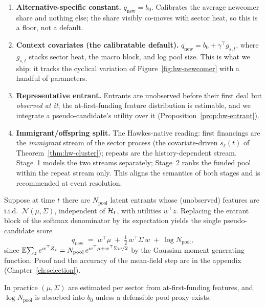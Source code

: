 \begin{enumerate}
\item \textbf{Alternative-specific constant.} $q_{\mathrm{new}} = b_0$. Calibrates the
average newcomer share and nothing else; the share visibly co-moves with sector heat, so
this is a floor, not a default.
\item \textbf{Context covariates (the calibratable default).}
$q_{\mathrm{new}} = b_0 + \gamma^\top g_{s,t}$, where $g_{s,t}$ stacks sector heat, the
macro block, and log pool size. This is what we ship: it tracks the cyclical variation of
Figure~\ref{fig:hw-newcomer} with a handful of parameters.
\item \textbf{Representative entrant.} Entrants are unobserved before their first deal
but \emph{observed at it}; the at-first-funding feature distribution is estimable, and we
integrate a pseudo-candidate's utility over it (Proposition~\ref{prop:hw-entrant}).
\item \textbf{Immigrant/offspring split.} The Hawkes-native reading: first financings are
the \emph{immigrant} stream of the sector process (the covariate-driven $s_\ell(t)$ of
Theorem~\ref{thm:hw-cluster}); repeats are the history-dependent stream. Stage~1 models
the two streams separately; Stage~2 ranks the funded pool within the repeat stream only.
This aligns the semantics of both stages and is recommended at event resolution.
\end{enumerate}

\begin{proposition}
\label{prop:hw-entrant}
Suppose at time $t$ there are $N_{\mathrm{pool}}$ latent entrants whose (unobserved)
features are i.i.d.\ $\mathcal{N}(\mu, \Sigma)$, independent of $\mathcal{H}_t$, with utilities
$w^\top z$. Replacing the entrant block of the softmax denominator by its expectation
yields the single pseudo-candidate score
\begin{equation}
\label{eq:hw-entrant}
q_{\mathrm{new}} \;=\; w^\top \mu \;+\; \tfrac{1}{2}\, w^\top \Sigma\, w
\;+\; \log N_{\mathrm{pool}} ,
\end{equation}
since $\mathbb{E}\!\sum_z e^{w^\top Z_z} = N_{\mathrm{pool}}\, e^{w^\top\mu + w^\top\Sigma w/2}$
by the Gaussian moment generating function. Proof and the accuracy of the mean-field step
are in the appendix (Chapter~\ref{ch:selection}).
\end{proposition}

In practice $(\mu, \Sigma)$ are estimated per sector from at-first-funding features, and
$\log N_{\mathrm{pool}}$ is absorbed into $b_0$ unless a defensible pool proxy exists.

